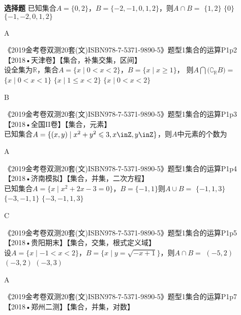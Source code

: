 \begin{exercise}{\bf 选择题}
      已知集合$A=\{0,2\}$，$B=\{-2,-1,0,1,2\}$，则$A\cap B=$\xz
       {$\{1,2\}$}
       {$\{0\}$}
       {$\{-1,-2,0,1,2\}$}
      \begin{answer}
        A
      \end{answer}
    \item 《2019金考卷双测20套(文)ISBN978-7-5371-9890-5》题型1集合的运算P1p2【2018•天津卷】【集合，补集交集，区间】\\
      设全集为$\mathbb{R}$，集合$A=\{x\mid 0<x<2\}$，$B=\{x\mid x\geqslant1\}$，
      则$A\bigcap\bigl(\complement_{\mathbb R}B\bigr)=$\xz
       {$\{x\mid 0<x<1\}$}
       {$\{x\mid 1\leqslant x<2\}$}
       {$\{x\mid 0<x<2\}$}
      \begin{answer}
        B
      \end{answer}
    \item 《2019金考卷双测20套(文)ISBN978-7-5371-9890-5》题型1集合的运算P1p3【2018•全国II卷】【集合，元素】\\
      已知集合$A=\{(x,y)\mid x^2+y^2\leqslant3,x\inZ,y\inZ\}$，则$A$中元素的个数为\xz
      \begin{answer}
        A
      \end{answer}
    \item 《2019金考卷双测20套(文)ISBN978-7-5371-9890-5》题型1集合的运算P1p4【2018•济南模拟】【集合，并集，二次方程】\\
      已知集合$A=\{x\mid x^2+2x-3=0\}$，$B=\{-1,1\}$则$A\cup B=$\xz
       {$\{-1,1,3\}$}
       {$\{-3,-1,1\}$}
       {$\{-3,-1,1,3\}$}
      \begin{answer}
        C
      \end{answer}
        \item 《2019金考卷双测20套(文)ISBN978-7-5371-9890-5》题型1集合的运算P1p5【2018•贵阳期末】【集合，交集，根式定义域】\\
          设$A=\{x\mid -1<x<2\}$，$B=\{x\mid y=\sqrt{-x+1}\}$，则$A\cap B=$\xz
          \xx{$(-1,1]$}
           {$(-5,2)$}
           {$(-3,2)$}
           {$(-3,3)$}
          \begin{answer}
            A
          \end{answer}
    \item 《2019金考卷双测20套(文)ISBN978-7-5371-9890-5》题型1集合的运算P1p7【2018•郑州二测】【集合，并集，对数】\\

\end{exercise}
